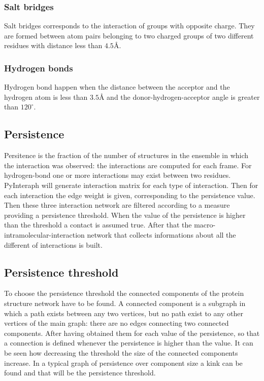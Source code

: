 		\subsubsection{Salt bridges}
		Salt bridges corresponds to the interaction of groups with opposite charge.
		They are formed between atom pairs belonging to two charged groups of two different residues with distance less than $4.5\si{\angstrom}$.

		\subsubsection{Hydrogen bonds}
		Hydrogen bond happen when the distance between the acceptor and the hydrogen atom is less than $3.5\si{\angstrom}$ and the donor-hydrogen-acceptor angle is greater than $120^\circ$.

	\subsection{Persistence}
	Persitence is the fraction of the number of structures in the ensemble in which the interaction was observed: the interactions are computed for each frame.
	For hydrogen-bond one or more interactions may exist between two residues.
	PyInteraph will generate interaction matrix for each type of interaction.
	Then for each interaction the edge weight is given, corresponding to the persistence value.
	Then these three interaction network are filtered according to a measure providing a persistence threshold.
	When the value of the persistence is higher than the threshold a contact is assumed true.
	After that the macro-intramolecular-interaction network that collects informations about all the different of interactions is built.

	\subsection{Persistence threshold}
	To choose the persistence threshold the connected components of the protein structure network have to be found.
	A connected component is a subgraph in which a path exists between any two vertices, but no path exist to any other vertices of the main graph: there are no edges connecting two connected components.
	After having obtained them for each value of the persistence, so that a connection is defined whenever the persistence is higher than the value.
	It can be seen how decreasing the threshold the size of the connected components increase.
	In a typical graph of persistence over component size a kink can be found and that will be the persistence threshold.

